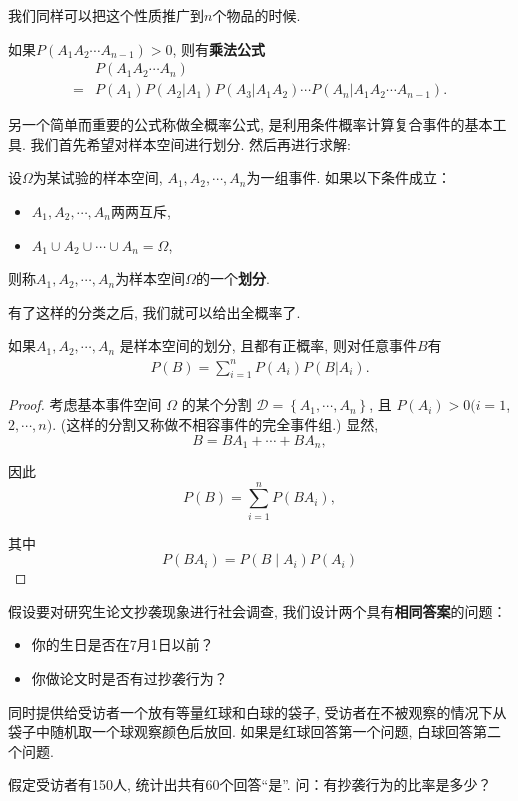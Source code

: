 我们同样可以把这个性质推广到$n$个物品的时候.

\begin{corollary}
    如果$P(A_1 A_2\cdots A_{n-1})>0$, 则有\textbf{乘法公式}
    \begin{align*}
          & P(A_1A_2\cdots A_n)                                                \\
        = & P(A_1)P(A_2|A_1)P(A_3|A_1 A_2)\cdots P(A_n|A_1 A_2\cdots A_{n-1}).
    \end{align*}
\end{corollary}



另一个简单而重要的公式称做全概率公式, 是利用条件概率计算复合事件的基本工具. 我们首先希望对样本空间进行划分. 然后再进行求解:

\begin{definition}
    设$\Omega$为某试验的样本空间, $A_1, A_2, \cdots, A_n$为一组事件. 如果以下条件成立：
    \begin{itemize}
        \item $A_1, A_2, \cdots, A_n$两两互斥, 
        \item $A_1 \cup A_2 \cup \cdots \cup A_n=\Omega$, 
    \end{itemize}
    则称$A_1, A_2, \cdots , A_n$为样本空间$\Omega$的一个\textbf{划分}. 
\end{definition}


有了这样的分类之后, 我们就可以给出全概率了.

\begin{theorem}[全概率公式]
    如果$A_1, A_2, \cdots, A_n$ 是样本空间的划分, 且都有正概率, 则对任意事件$B$有
    \begin{align*}
        P(B)=\sum_{i=1}^n P(A_i) P(B|A_i).
    \end{align*}
\end{theorem}

\begin{proof}
    考虑基本事件空间 $\Omega$ 的某个分割 $\mathscr{D}=\left\{A_1, \cdots, A_n\right\}$, 且 $P\left(A_i\right)>0(i=1$, $2, \cdots, n)$. (这样的分割又称做不相容事件的完全事件组.) 显然,
$$
B=B A_1+\cdots+B A_n,
$$

因此
$$
P(B)=\sum_{i=1}^n P\left(B A_i\right),
$$

其中
$$
P\left(B A_i\right)=P\left(B \mid A_i\right) P\left(A_i\right)
$$
\end{proof}


\begin{example}
    假设要对研究生论文抄袭现象进行社会调查, 我们设计两个具有\textbf{相同答案}的问题：
    \begin{itemize}
        \item 你的生日是否在7月1日以前？
        \item 你做论文时是否有过抄袭行为？
    \end{itemize}
    同时提供给受访者一个放有等量红球和白球的袋子, 
    受访者在不被观察的情况下从袋子中随机取一个球观察颜色后放回. 
    如果是红球回答第一个问题, 白球回答第二个问题. 

    假定受访者有150人, 统计出共有60个回答``是''. 问：有抄袭行为的比率是多少？
\end{example}

